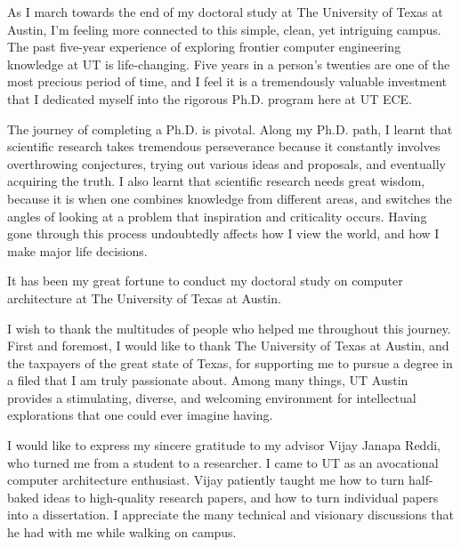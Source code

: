 
\begin{acknowledgments}		%

As I march towards the end of my doctoral study at The University of Texas at Austin, I'm feeling more connected to this simple, clean, yet intriguing campus. The past five-year experience of exploring frontier computer engineering knowledge at UT is life-changing. Five years in a person's twenties are one of the most precious period of time, and I feel it is a tremendously valuable investment that I dedicated myself into the rigorous Ph.D. program here at UT ECE.

The journey of completing a Ph.D. is pivotal. Along my Ph.D. path, I learnt that scientific research takes tremendous perseverance because it constantly involves overthrowing conjectures, trying out various ideas and proposals, and eventually acquiring the truth. I also learnt that scientific research needs great wisdom, because it is when one combines knowledge from different areas, and switches the angles of looking at a problem that inspiration and criticality occurs. Having gone through this process undoubtedly affects how I view the world, and how I make major life decisions. 

It has been my great fortune to conduct my doctoral study on computer architecture at The University of Texas at Austin. 



% 



I wish to thank the multitudes of people who helped me throughout this journey. First and foremost, I would like to thank The University of Texas at Austin, and the taxpayers of the great state of Texas, for supporting me to pursue a degree in a filed that I am truly passionate about. Among many things, UT Austin provides a stimulating, diverse, and welcoming environment for intellectual explorations that one could ever imagine having.

I would like to express my sincere gratitude to my advisor Vijay Janapa Reddi, who turned me from a student to a researcher. I came to UT as an avocational computer architecture enthusiast. Vijay patiently taught me how to turn half-baked ideas to high-quality research papers, and how to turn individual papers into a dissertation. I appreciate the many technical and visionary discussions that he had with me while walking on campus.


\end{acknowledgments}
